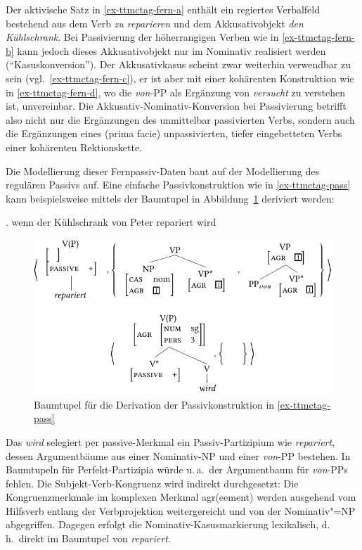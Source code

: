 Der aktivische Satz in \ref{ex-ttmctag-fern-a} enthält ein regiertes Verbalfeld bestehend aus dem Verb {\it zu reparieren} und dem Akkusativobjekt {\it den Kühlschrank}. Bei Passivierung der höherrangigen Verben wie in \ref{ex-ttmctag-fern-b} kann jedoch dieses Akkusativobjekt nur im Nominativ realisiert werden ("`Kasuskonversion"'). Der Akkusativkasus scheint zwar weiterhin verwendbar zu sein (vgl.\ \ref{ex-ttmctag-fern-c}), er ist aber mit einer kohärenten Konstruktion wie in \ref{ex-ttmctag-fern-d}, wo die {\it von}-PP als Ergänzung von \textit{versucht} zu verstehen ist, unvereinbar. Die Akkusativ-Nominativ-Konversion bei Passivierung betrifft also nicht nur die Ergänzungen des unmittelbar passivierten Verbs, sondern auch die Ergänzungen eines (prima facie) unpassivierten, tiefer eingebetteten Verbs einer kohärenten Rektionskette.

Die Modellierung dieser Fernpassiv-Daten baut auf der Modellierung des regulären Passivs auf. Eine einfache Passivkonstruktion wie in \ref{ex-ttmctag-pass} kann beispielsweise mittels der Baumtupel in Abbildung~\ref{fig-ttmctag-pass-1} deriviert werden:

\ex. \label{ex-ttmctag-pass} wenn der Kühlschrank von Peter repariert wird

\begin{figure}[t]
\centering
\includegraphics{graphics/abb722.pdf}
\caption{\label{fig-ttmctag-pass-1}Baumtupel für die Derivation der Passivkonstruktion in \ref{ex-ttmctag-pass}}
\end{figure} 
Das  {\it wird} selegiert per {\sc passive}-Merkmal ein Passiv-Partizipium wie {\it repariert}, dessen Argumentbäume aus einer Nominativ-NP und einer \emph{von}-PP bestehen. In Baumtupeln für Perfekt-Partizipia würde u.\,a.\ der Argumentbaum für \emph{von}-PPs fehlen. Die Subjekt-Verb-Kongruenz wird indirekt durchgesetzt: Die Kongruenzmerkmale im komplexen Merkmal {\sc agr(eement)} werden ausgehend vom Hilfsverb entlang der Verbprojektion  weitergereicht und von der Nominativ"=NP abgegriffen. Dagegen erfolgt die Nominativ-Kasusmarkierung lexikalisch, d.\,h.\ direkt im Baumtupel von {\it repariert}.

